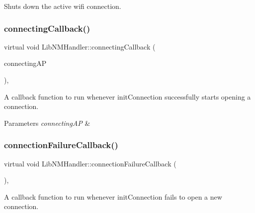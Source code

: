 Shuts down the active wifi connection. \mbox{\label{classLibNMHandler_a0293706bcd78723eac0b4b03088d163c}} 
\subsubsection{\texorpdfstring{connecting\+Callback()}{connectingCallback()}}
{\footnotesize\ttfamily virtual void Lib\+N\+M\+Handler\+::connecting\+Callback (\begin{DoxyParamCaption}\item[{\mbox{\hyperlink{classWifiAccessPoint_ad18977f884076774803027efbaa131a0}{Wifi\+Access\+Point\+::\+Ptr}}}]{connecting\+AP }\end{DoxyParamCaption})\hspace{0.3cm}{\ttfamily [protected]}, {}}

A callback function to run whenever init\+Connection successfully starts opening a connection.


\begin{DoxyParams}{Parameters}
{\em connecting\+AP} & \\
\hline
\end{DoxyParams}
\mbox{\label{classLibNMHandler_a66756166eb9bca40cd7659a55c2435c1}} 
\subsubsection{\texorpdfstring{connection\+Failure\+Callback()}{connectionFailureCallback()}}
{\footnotesize\ttfamily virtual void Lib\+N\+M\+Handler\+::connection\+Failure\+Callback (\begin{DoxyParamCaption}{ }\end{DoxyParamCaption})\hspace{0.3cm}{\ttfamily [protected]}, {}}

A callback function to run whenever init\+Connection fails to open a new connection. \mbox{\label{classLibNMHandler_ac3edd122ddaea5d2322a719bed003dc5}} 
